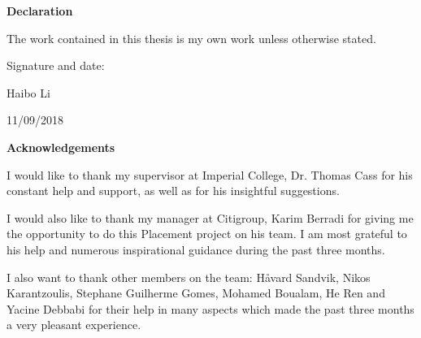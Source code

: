 

\mbox{}\newline\vspace{10mm} \mbox{}\LARGE
%
{\bf Declaration} \normalsize \vspace{5mm}

The work contained in this thesis is my own work unless otherwise stated.

\bigskip
\bigskip
\bigskip


Signature and date: 

Haibo Li

11/09/2018

\newpage

\mbox{}\newline\vspace{10mm} \mbox{}\LARGE
%
{\bf Acknowledgements} \normalsize \vspace{5mm}

I would like to thank my supervisor at Imperial College, Dr. Thomas Cass for his constant help and support, as well as for his insightful suggestions.

I would also like to thank my manager at Citigroup, Karim Berradi for giving me the opportunity to do this Placement project on his team. I am most grateful to his help and numerous inspirational guidance during the past three months.

I also want to thank other members on the team: H\aa vard Sandvik, Nikos Karantzoulis, Stephane Guilherme Gomes, Mohamed Boualam, He Ren and Yacine Debbabi for their help in many aspects which made the past three months a very pleasant experience.






